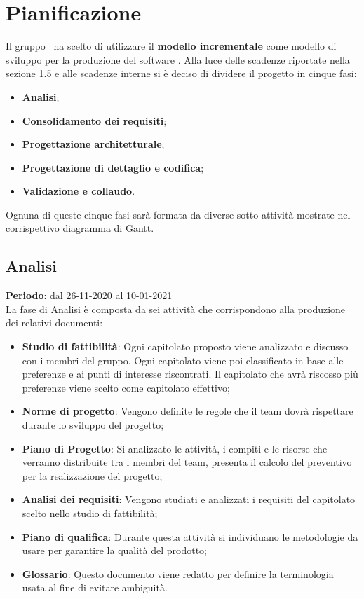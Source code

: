 \section{Pianificazione}
	Il gruppo \cod\ ha scelto di utilizzare il \textbf{modello incrementale} come modello di sviluppo per la produzione del software \hd .
	Alla luce delle scadenze riportate nella sezione 1.5 e alle scadenze interne si è deciso di dividere il progetto in cinque fasi:
	\begin{itemize}
		\item \textbf{Analisi};
		\item \textbf{Consolidamento dei requisiti};
		\item \textbf{Progettazione architetturale};
		\item \textbf{Progettazione di dettaglio e codifica};
		\item \textbf{Validazione e collaudo}.
	\end{itemize}
	Ognuna di queste cinque fasi sarà formata da diverse sotto attività mostrate nel corrispettivo diagramma di Gantt.

	\subsection{Analisi}	\textbf{Periodo}: dal 26-11-2020 al 10-01-2021 \\
	La fase di Analisi è composta da sei attività che corrispondono alla produzione dei relativi documenti:
	\begin{itemize}
		\item \textbf{Studio di fattibilità}: Ogni capitolato proposto viene analizzato e discusso con i membri del gruppo. Ogni capitolato viene poi classificato in base alle preferenze e ai punti di interesse riscontrati. Il capitolato che avrà riscosso più preferenze viene scelto come capitolato effettivo;
		\item \textbf{Norme di progetto}: Vengono definite le regole che il team dovrà rispettare durante lo sviluppo del progetto;
		\item \textbf{Piano di Progetto}: Si analizzato le attività, i compiti e le risorse che verranno distribuite tra i membri del team, presenta il calcolo del preventivo per la realizzazione del progetto;
		\item \textbf{Analisi dei requisiti}: Vengono studiati e analizzati i requisiti del capitolato scelto nello studio di fattibilità;
		\item \textbf{Piano di qualifica}: Durante questa attività si individuano le metodologie da usare per garantire la qualità del prodotto;
		\item \textbf{Glossario}: Questo documento viene redatto per definire la terminologia usata al fine di evitare ambiguità.
	\end{itemize}

